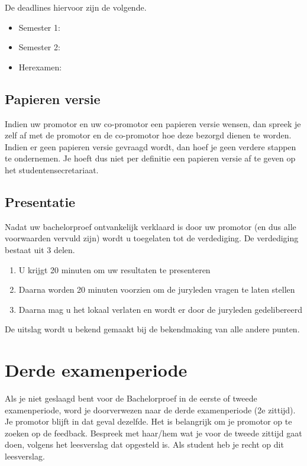 De deadlines hiervoor zijn de volgende. 
\begin{framed}
\begin{itemize}
	\item Semester 1: \indienenBPSemEen{}
	\item Semester 2: \indienenBPSemTwee{}
	\item Herexamen: \indienenBPderdeeEx{}
\end{itemize}
\end{framed}
\subsection{Papieren versie}
Indien uw promotor en uw co-promotor een papieren versie wensen, dan spreek je zelf af met de promotor en de co-promotor hoe deze bezorgd dienen te worden. Indien er geen papieren versie gevraagd wordt, dan hoef je geen verdere stappen te ondernemen. Je hoeft dus niet per definitie een papieren versie af te geven op het studentensecretariaat.

\subsection{Presentatie}
Nadat uw bachelorproef ontvankelijk verklaard is door uw promotor (en dus alle voorwaarden vervuld zijn) wordt u toegelaten tot de verdediging. De verdediging bestaat uit 3 delen.
\begin{enumerate}
	\item U krijgt 20 minuten om uw resultaten te presenteren
	\item Daarna worden 20 minuten voorzien om de juryleden vragen te laten stellen
	\item Daarna mag u het lokaal verlaten en wordt er door de juryleden gedelibereerd
\end{enumerate}
De uitslag wordt u bekend gemaakt bij de bekendmaking van alle andere punten.

\section{Derde examenperiode}
Als je niet geslaagd bent voor de Bachelorproef in de eerste of tweede examenperiode, word je doorverwezen naar de derde examenperiode (2e zittijd). Je promotor blijft in dat geval dezelfde. Het is belangrijk om je promotor op te zoeken op de feedback. Bespreek met haar/hem wat je voor de tweede zittijd gaat doen, volgens het leesverslag dat opgesteld is. Als student heb je recht op dit leesverslag. 

